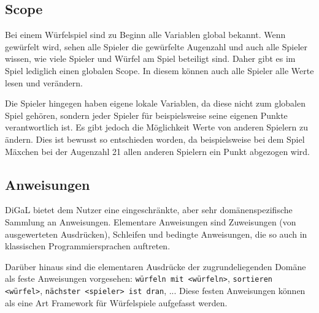 	\subsection{Scope}
	\label{sub:scope}
		Bei einem Würfelspiel sind zu Beginn alle Variablen global bekannt. Wenn gewürfelt wird, sehen alle Spieler die gewürfelte Augenzahl und auch alle Spieler wissen, wie viele Spieler und Würfel am Spiel beteiligt sind. Daher gibt es im Spiel lediglich einen globalen Scope. In diesem können auch alle Spieler alle Werte lesen und verändern.

		Die Spieler hingegen haben eigene lokale Variablen, da diese nicht zum globalen Spiel gehören, sondern jeder Spieler für beispielsweise seine eigenen Punkte verantwortlich ist. Es gibt jedoch die Möglichkeit Werte von anderen Spielern zu ändern. Dies ist bewusst so entschieden worden, da beispielsweise bei dem Spiel Mäxchen bei der Augenzahl 21 allen anderen Spielern ein Punkt abgezogen wird.

	\subsection{Anweisungen}
	\label{sub:anweisungen}
		DiGaL bietet dem Nutzer eine eingeschränkte, aber sehr domänenspezifische Sammlung an Anweisungen. Elementare Anweisungen sind Zuweisungen (von ausgewerteten Ausdrücken), Schleifen und bedingte Anweisungen, die so auch in klassischen Programmiersprachen auftreten.

		Darüber hinaus sind die elementaren Ausdrücke der zugrundeliegenden Domäne als feste Anweisungen vorgesehen: \texttt{würfeln mit <würfeln>}, \texttt{sortieren <würfel>}, \texttt{nächster <spieler> ist dran}, ... Diese festen Anweisungen können als eine Art Framework für Würfelspiele aufgefasst werden.
